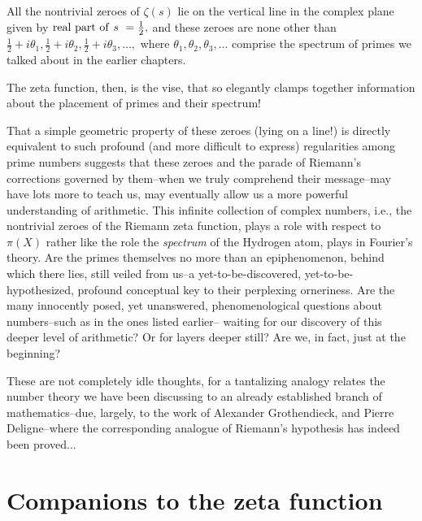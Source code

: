 \documentclass[openany]{book}
\theoremstyle{plain}
\theoremstyle{definition}
\begin{document}
{{{\begin{center}
{\begin{minipage}{0.9\textwidth}
       All the nontrivial zeroes of $\zeta(s)$ lie on the vertical
       line in the complex plane given by ${\rm real\ part\ of\ } s\ =
       {\frac{1}{2}},$ and these zeroes are none other than
       ${\frac{1}{2}}+i\theta_1,{\frac{1}{2}}+i\theta_2,
       {\frac{1}{2}}+i\theta_3,\dots,$ where $\theta_1, \theta_2,
       \theta_3, \dots$ comprise the spectrum of primes we talked
       about in the earlier chapters.

\vspace{1ex}
\end{minipage}}
      \end{center}


      The zeta function, then, is the vise, that so elegantly clamps
      together information about the placement of primes and their
      spectrum!


That a simple geometric property of these zeroes (lying on a line!) is
directly equivalent to such profound (and more difficult to express)
regularities among prime numbers suggests that these zeroes and the
parade of Riemann's corrections governed by them--when we truly
comprehend their message--may have lots more to teach us, may
eventually allow us a more powerful understanding of arithmetic.  This
infinite collection of complex numbers, i.e., the nontrivial zeroes of
the Riemann zeta function, plays a role with respect to $\pi(X)$ rather
like the role the {\em spectrum} of the Hydrogen atom, plays in
Fourier's theory.  Are the primes themselves no more than an
epiphenomenon, behind which there lies, still veiled from us--a
yet-to-be-discovered, yet-to-be-hypothesized, profound conceptual key
to their perplexing orneriness.  Are the many innocently posed, yet
unanswered, phenomenological questions about numbers--such as in the
ones listed earlier-- waiting for our discovery of this deeper level
of arithmetic?  Or for layers deeper still?  Are we, in fact, just at
the beginning?




These are not completely idle thoughts, for a tantalizing analogy
relates the number theory we have been discussing to an already
established branch of mathematics--due, largely, to the work of
Alexander Grothendieck, and Pierre Deligne--where the corresponding
analogue of Riemann's hypothesis has indeed been proved$\dots$



\chapter{Companions to the zeta function}

}}}
\end{document}
